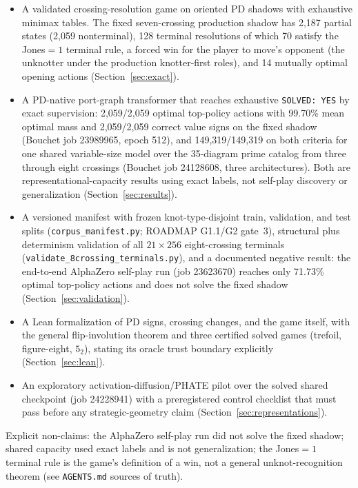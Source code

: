 \begin{itemize}
    \item A validated crossing-resolution game on oriented PD shadows with
        exhaustive minimax tables. The fixed seven-crossing production shadow
        has 2,187 partial states (2,059 nonterminal), 128 terminal resolutions
        of which 70 satisfy the Jones$=1$ terminal rule, a forced win for the
        player to move's opponent (the unknotter under the production
        knotter-first roles), and 14 mutually optimal opening actions
        (Section~\ref{sec:exact}).
    \item A PD-native port-graph transformer that reaches exhaustive
        \texttt{SOLVED: YES} by exact supervision: 2,059/2,059 optimal
        top-policy actions with 99.70\% mean optimal mass and 2,059/2,059
        correct value signs on the fixed shadow (Bouchet job 23989965, epoch
        512), and 149,319/149,319 on both criteria for one shared
        variable-size model over the 35-diagram prime catalog from three
        through eight crossings (Bouchet job 24128608, three architectures).
        Both are representational-capacity results using exact labels, not
        self-play discovery or generalization (Section~\ref{sec:results}).
    \item A versioned manifest with frozen knot-type-disjoint train, validation,
        and test splits (\texttt{corpus\_manifest.py}; ROADMAP G1.1/G2 gate~3),
        structural plus determinism validation of all $21 \times 256$
        eight-crossing terminals
        (\texttt{validate\_8crossing\_terminals.py}), and a documented negative
        result: the end-to-end AlphaZero self-play run (job 23623670) reaches
        only 71.73\% optimal top-policy actions and does not solve the fixed
        shadow (Section~\ref{sec:validation}).
    \item A Lean formalization of PD signs, crossing changes, and the game
        itself, with the general flip-involution theorem and three certified
        solved games (trefoil, figure-eight, $5_2$), stating its oracle trust
        boundary explicitly (Section~\ref{sec:lean}).
    \item An exploratory activation-diffusion/PHATE pilot over the solved
        shared checkpoint (job 24228941) with a preregistered control checklist
        that must pass before any strategic-geometry claim
        (Section~\ref{sec:representations}).
\end{itemize}

Explicit non-claims: the AlphaZero self-play run did not solve the fixed
shadow; shared capacity used exact labels and is not generalization; the
Jones$=1$ terminal rule is the game's definition of a win, not a general
unknot-recognition theorem (see \texttt{AGENTS.md} sources of truth).
